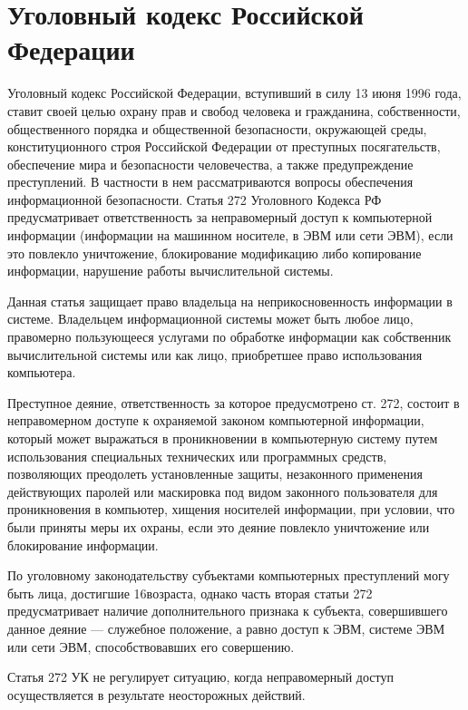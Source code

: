 \section{Уголовный кодекс Российской Федерации} \label{rights_uk}

Уголовный кодекс Российской Федерации, вступивший в силу 13 июня 1996 года, ставит своей целью охрану прав и свобод человека и гражданина, собственности, общественного порядка и общественной безопасности, окружающей среды, конституционного строя Российской Федерации от преступных посягательств, обеспечение мира и безопасности человечества, а также предупреждение преступлений. В частности в нем рассматриваются вопросы обеспечения информационной безопасности. Статья 272 Уголовного Кодекса РФ предусматривает ответственность за неправомерный доступ к компьютерной информации (информации на машинном носителе, в ЭВМ или сети ЭВМ), если это повлекло уничтожение, блокирование модификацию либо копирование информации, нарушение работы вычислительной системы.

\vspace{\baselineskip}
Данная статья защищает право владельца на неприкосновенность информации в системе. Владельцем информационной системы может быть любое лицо, правомерно пользующееся услугами по обработке информации как собственник вычислительной системы или как лицо, приобретшее право использования компьютера.

\vspace{\baselineskip}
Преступное деяние, ответственность за которое предусмотрено ст. 272, состоит в неправомерном доступе к охраняемой законом компьютерной информации, который может выражаться в проникновении в компьютерную систему путем использования специальных технических или программных средств, позволяющих преодолеть установленные защиты, незаконного применения действующих паролей или маскировка под видом законного пользователя для проникновения в компьютер, хищения носителей информации, при условии, что были приняты меры их охраны, если это деяние повлекло уничтожение или блокирование информации.

\vspace{\baselineskip}
По уголовному законодательству субъектами компьютерных преступлений могу быть лица, достигшие 16 возраста, однако часть вторая статьи 272 предусматривает наличие дополнительного признака к субъекта, совершившего данное деяние --- служебное положение, а равно доступ к ЭВМ, системе ЭВМ или сети ЭВМ, способствовавших его совершению.

\vspace{\baselineskip}
Статья 272 УК не регулирует ситуацию, когда неправомерный доступ осуществляется в результате неосторожных действий.